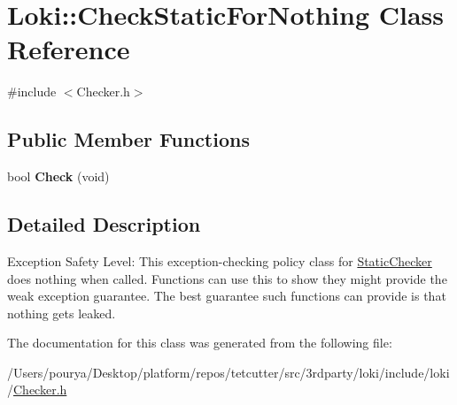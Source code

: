 \hypertarget{classLoki_1_1CheckStaticForNothing}{}\section{Loki\+:\+:Check\+Static\+For\+Nothing Class Reference}
\label{classLoki_1_1CheckStaticForNothing}


{\ttfamily \#include $<$Checker.\+h$>$}

\subsection*{Public Member Functions}
\begin{DoxyCompactItemize}
\item 
\hypertarget{classLoki_1_1CheckStaticForNothing_a95876d3c042012998fccfb0318adf821}{}bool {\bfseries Check} (void)\label{classLoki_1_1CheckStaticForNothing_a95876d3c042012998fccfb0318adf821}

\end{DoxyCompactItemize}


\subsection{Detailed Description}
\begin{DoxyParagraph}{Exception Safety Level\+:}
This exception-\/checking policy class for \hyperlink{classLoki_1_1StaticChecker}{Static\+Checker} does nothing when called. Functions can use this to show they might provide the weak exception guarantee. The best guarantee such functions can provide is that nothing gets leaked. 
\end{DoxyParagraph}


The documentation for this class was generated from the following file\+:\begin{DoxyCompactItemize}
\item 
/\+Users/pourya/\+Desktop/platform/repos/tetcutter/src/3rdparty/loki/include/loki/\hyperlink{Checker_8h}{Checker.\+h}\end{DoxyCompactItemize}
